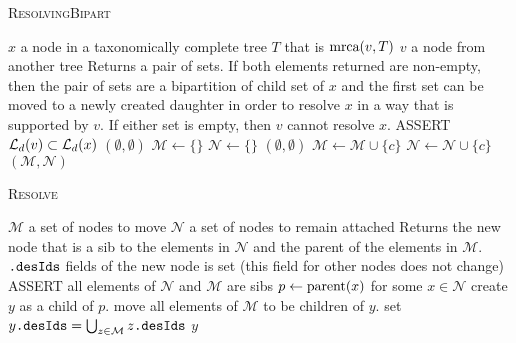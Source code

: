 \documentclass[11pt]{article}
\begin{document}
\begin{algorithm} \caption{\textsc{ResolvingBipart}}\label{AlgResolvingBipart}
\begin{algorithmic}
\REQUIRE $x$ a node in a taxonomically complete tree $T$ that is $\mbox{mrca}(v, T)$
\REQUIRE $v$ a node from another tree
\ENSURE Returns a pair of sets. If both elements returned are non-empty, then 
    the pair of sets are a  bipartition of child set of $x$ and the first set 
    can be moved to a newly created daughter in order to resolve $x$ in 
    a way that is supported by $v$.
    If either set is empty, then  $v$ cannot resolve $x$.
\STATE ASSERT $\mathcal{L}_d(v) \subset \mathcal{L}_d(x)$
    \RETURN $(\emptyset, \emptyset)$ 
\ENDIF
\STATE $\mathcal{M}\leftarrow \{\}$
\STATE $\mathcal{N} \leftarrow \{\}$
            \RETURN $(\emptyset, \emptyset)$ 
        \ENDIF
        $\mathcal{M}\leftarrow \mathcal{M} \cup \{ c\}$
    \ELSE
        $\mathcal{N}\leftarrow \mathcal{N} \cup \{ c\}$
    \ENDIF
\ENDFOR \\
\RETURN $(\mathcal{M}, \mathcal{N})$
\end{algorithmic}
\end{algorithm}

\begin{algorithm} \caption{\textsc{Resolve}}\label{AlgResolve}
\begin{algorithmic}
\REQUIRE $\mathcal{M}$ a set of nodes to move
\REQUIRE $\mathcal{N}$ a set of nodes to remain attached
\ENSURE Returns the new node that is a sib to the elements in $\mathcal{N}$ and the parent of the elements in $\mathcal{M}$.
\ENSURE ${}\texttt{.desIds}$ fields of the new node is set (this field for other nodes does not change)
\STATE ASSERT all elements of $\mathcal{N}$ and $\mathcal{M}$ are sibs
\STATE $p\leftarrow \mbox{parent}(x)$ for some $x\in \mathcal{N}$
\STATE create $y$ as a child of $p$.
\STATE move all elements of $\mathcal{M}$ to be children of $y$.
\STATE set ${y}\texttt{.desIds} = \bigcup_{z\in\mathcal{M}}{z}\texttt{.desIds}$
\RETURN $y$
\end{algorithmic}
\end{algorithm}
\end{document}
